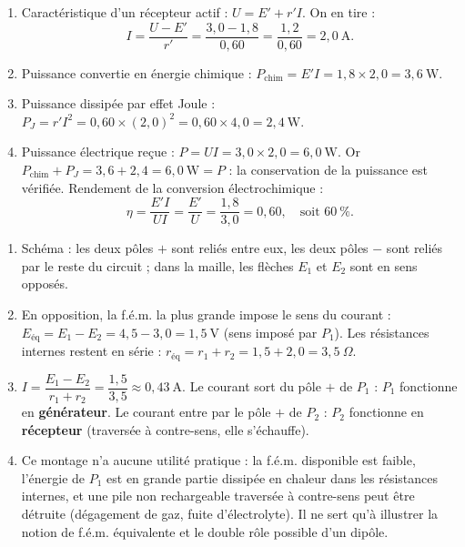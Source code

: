 \documentclass[11pt]{article}
\begin{document}
\begin{corrige}
\begin{enumerate}
\item Caractéristique d'un récepteur actif : $U = E' + r'I$. On en tire :
\[ I = \dfrac{U - E'}{r'} = \dfrac{3,0 - 1,8}{0,60} = \dfrac{1,2}{0,60} = 2,0~\text{A}. \]
\item Puissance convertie en énergie chimique : $P_{\text{chim}} = E'I = 1,8 \times 2,0 = 3,6~\text{W}$.
\item Puissance dissipée par effet Joule : $P_J = r'I^2 = 0,60 \times (2,0)^2 = 0,60 \times 4,0 = 2,4~\text{W}$.
\item Puissance électrique reçue : $P = UI = 3,0 \times 2,0 = 6,0~\text{W}$. Or $P_{\text{chim}} + P_J = 3,6 + 2,4 = 6,0~\text{W} = P$ : la conservation de la puissance est vérifiée. Rendement de la conversion électrochimique :
\[ \eta = \dfrac{E'I}{UI} = \dfrac{E'}{U} = \dfrac{1,8}{3,0} = 0,60, \quad \text{soit } 60~\%. \]
\end{enumerate}
\end{corrige}

\begin{corrige}
\begin{enumerate}
\item Schéma : les deux pôles $+$ sont reliés entre eux, les deux pôles $-$ sont reliés par le reste du circuit ; dans la maille, les flèches $E_1$ et $E_2$ sont en sens opposés.
\item En opposition, la f.é.m. la plus grande impose le sens du courant : $E_{\text{éq}} = E_1 - E_2 = 4,5 - 3,0 = 1,5~\text{V}$ (sens imposé par $P_1$). Les résistances internes restent en série : $r_{\text{éq}} = r_1 + r_2 = 1,5 + 2,0 = 3,5~\Omega$.
\item $I = \dfrac{E_1 - E_2}{r_1 + r_2} = \dfrac{1,5}{3,5} \approx 0,43~\text{A}$. Le courant sort du pôle $+$ de $P_1$ : $P_1$ fonctionne en \textbf{générateur}. Le courant entre par le pôle $+$ de $P_2$ : $P_2$ fonctionne en \textbf{récepteur} (traversée à contre-sens, elle s'échauffe).
\item Ce montage n'a aucune utilité pratique : la f.é.m. disponible est faible, l'énergie de $P_1$ est en grande partie dissipée en chaleur dans les résistances internes, et une pile non rechargeable traversée à contre-sens peut être détruite (dégagement de gaz, fuite d'électrolyte). Il ne sert qu'à illustrer la notion de f.é.m. équivalente et le double rôle possible d'un dipôle.
\end{enumerate}
\end{corrige}
\end{document}
